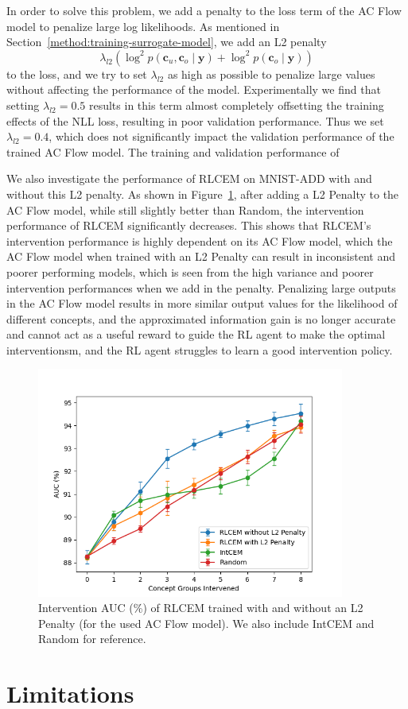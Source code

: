 In order to solve this problem, we add a penalty 
to the loss term of the AC Flow model to penalize
large log likelihoods. As mentioned in Section~\ref{method:training-surrogate-model},
we add an L2 penalty
\[\lambda_{l2} \left ( \log^2 p(\mathbf{c}_u, \mathbf{c}_o \mid \mathbf{y}) + 
\log^2 p(\mathbf{c}_o \mid \mathbf{y}) \right )\]
to the loss, and we try to set $\lambda_{l2}$ 
as high as possible to penalize large values without affecting the performance of the model.
Experimentally we find that setting $\lambda_{l2} = 0.5$ results 
in this term almost completely offsetting the training 
effects of the NLL loss, resulting in 
poor validation performance. Thus we set $\lambda_{l2} = 0.4$,
which does not significantly impact the validation performance of the trained AC Flow model.
The training and validation performance of 




We also investigate the performance of RLCEM on MNIST-ADD with and without
this L2 penalty.
As shown in Figure~\ref{fig:mnist-rlcem_performance-l2},
after adding a L2 Penalty to the AC Flow model,
while still slightly better than Random, the intervention performance of RLCEM significantly decreases.
This shows that RLCEM's intervention performance is highly dependent on its AC Flow
model, which the AC Flow model when trained with an L2 Penalty can result in inconsistent and poorer performing
models,
which is seen from the high variance and poorer
intervention performances when we add in the penalty. Penalizing large outputs 
in the AC Flow model results in more similar output values for the likelihood
of different concepts, and the approximated information gain is no longer
accurate and cannot act as a useful reward to guide the RL agent to make 
the optimal interventionsm, and the RL agent struggles to learn a good intervention policy.

\begin{figure}[!h]
    \centering
    \includegraphics[width=0.9\textwidth]{figs/evaluation/mnist_rlcem_performance_l2.png}
    \caption{
        Intervention AUC (\%) of RLCEM trained with and without an L2 Penalty (for the used AC Flow model).
        We also include IntCEM and Random for reference.
    }
    \label{fig:mnist-rlcem_performance-l2}
\end{figure}



\section{Limitations}\label{eval:limitations}

